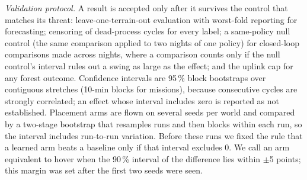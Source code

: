 \textit{Validation protocol.} A result is accepted only after it survives the
control that matches its threat: leave-one-terrain-out evaluation with
worst-fold reporting for forecasting; censoring of dead-process cycles for every
label; a same-policy null control (the same comparison applied to two nights of
one policy) for closed-loop comparisons made across nights, where a
comparison counts only if the null control's interval rules out a swing as
large as the effect; and the uplink cap
for any forest outcome. Confidence intervals are 95\,\% block bootstraps over
contiguous stretches (10-min blocks for missions), because consecutive cycles
are strongly correlated; an effect whose interval includes zero is reported as
not established. Placement arms are flown on several seeds per world and
compared by a two-stage bootstrap that resamples runs and then blocks within
each run, so the interval includes run-to-run variation. Before these runs we
fixed the rule that a learned arm beats a baseline only if that interval
excludes 0. We call an arm equivalent to hover when the 90\,\% interval of the
difference lies within $\pm$5 points; this margin was set after the first two
seeds were seen.
